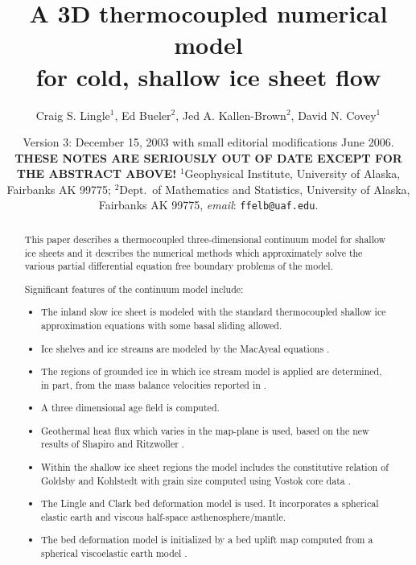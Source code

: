 \documentclass{amsart}%
\theoremstyle{plain}
\theoremstyle{definition}
\theoremstyle{remark}
\newcommand{\mtt}{\texttt}
\begin{document}
\title[3D thermocoupled model for ice sheets]{A 3D thermocoupled numerical model \\ for cold, shallow ice sheet flow}

\author[Lingle and others]{Craig S. Lingle$^1$, Ed Bueler$^2$, Jed A. Kallen-Brown$^2$, David N. Covey$^1$}

\date{\scriptsize Version 3: December 15, 2003 with small editorial modifications June 2006.   \textbf{THESE NOTES ARE SERIOUSLY OUT OF DATE EXCEPT FOR THE ABSTRACT ABOVE!}  $^1$Geophysical Institute, University of Alaska, Fairbanks AK 99775;
$^2$Dept.~of Mathematics and Statistics, University of Alaska, Fairbanks AK 99775,
\emph{email}: \mtt{ffelb@uaf.edu}. \normalsize}

\begin{abstract}  This paper describes a thermocoupled three-dimensional continuum model for shallow ice sheets and it describes the numerical methods which approximately solve the various partial differential equation free boundary problems of the model.

\medskip\noindent Significant features of the continuum model include:\begin{itemize}
\item The inland slow ice sheet is modeled with the standard thermocoupled shallow ice approximation equations \cite{Fowler} with some basal sliding allowed.
\item Ice shelves and ice streams are modeled by the MacAyeal equations \cite{MacAyeal,MacAyealetal}.
\item The regions of grounded ice in which ice stream model is applied are determined, in part, from the mass balance velocities reported in \cite{BamberVaughanJoughin}.
\item A three dimensional age field is computed.
\item Geothermal heat flux which varies in the map-plane is used, based on the new results of Shapiro and Ritzwoller \cite{ShapiroRitzwoller}.
\item Within the shallow ice sheet regions the model includes the constitutive relation of Goldsby and Kohlstedt \cite{GoldsbyKohlstedt,Peltieretal} with grain size computed using Vostok core data \cite{VostokCore}.
\item The Lingle and Clark bed deformation model \cite{LingleClark} is used.  It incorporates a spherical elastic earth and viscous half-space asthenosphere/mantle.
\item The bed deformation model is initialized by a bed uplift map computed from a spherical viscoelastic earth model \cite{JamesIvins1998}.\end{itemize}


\end{abstract}
\end{document}
